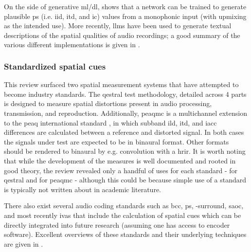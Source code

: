 \documentclass[referee,pdflatex,sn-mathphys-num]{sn-jnl}%
\begin{document}
On the side of generative \gls{ml}/\gls{dl}, \cite{serraMonotostereoParametricStereo2023} shows that a network can be trained to generate plausible \gls{ps} (i.e. \gls{iid}, \gls{itd}, and \gls{ic}) values from a monophonic input (with upmixing as the intended use). More recently, \glspl{llm} have been used to generate textual descriptions of the spatial qualities of audio recordings; a good summary of the various different implementations is given in \cite{jiangSciPhiLargeLanguage2025}.


\subsubsection{Standardized spatial cues}
\label{sec:standard_spatial_cues}
This review surfaced two spatial measurement systems that have attempted to become industry standards. The \gls{qestral} test methodology, detailed across 4 parts \cite{rumseyQESTRALPart12008,conettaQESTRALPart22008,jacksonQESTRALPart32008,dewhirstQESTRALPart42008} is designed to measure spatial distortions present in audio processing, transmission, and reproduction. Additionally, \gls{peaqmc} \cite{kampfStandardizationPEAQMCExtension2010} is a multichannel extension to the \gls{peaq} international standard \cite{itu-r-bs-1387_PEAQ}, in which subband \gls{ild}, \gls{itd}, and \gls{iacc} differences are calculated between a reference and distorted signal. In both cases the signals under test are expected to be in binaural format. Other formats should be rendered to binaural by e.g. convolution with a \gls{hrir}. It is worth noting that while the development of the measures is well documented and rooted in good theory, the review revealed only a handful of uses for each standard - \cite{koyaPredictingOverallSpatial2018,koyaPerceptualModelSpatial2023} for \gls{qestral} and \cite{nowakQualityAssessmentSpherical2019} for \gls{peaqmc} - although this could be because simple use of a standard is typically not written about in academic literature.

There also exist several audio coding standards such as \gls{bcc}, \gls{ps}, -surround, \gls{saoc}, and most recently \gls{ivas} that include the calculation of spatial cues which can be directly integrated into future research (assuming one has access to encoder software). Excellent overviews of these standards and their underlying techniques are given in \cite{herreParametricStereoCoding2022,bruhn3GPPIVASCodec2025}.
\end{document}

